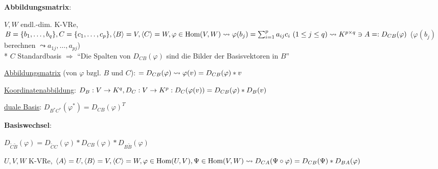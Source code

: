 \textbf{Abbildungsmatrix}:
\begin{items}
	\item $V,W$ endl.-dim. K-VRe, $B=\{ b_1, \dots, b_q \}, C=\{c_1, \dots, c_p \}, \\* \langle B \rangle = V, \langle C \rangle = W, \varphi \in \text{Hom}(V,W) \\* \leadsto \varphi(b_j)=\sum_{i=1}^p a_{ij}c_i \ (1 \leq j \leq q) \\* \leadsto K^{p \times q} \ni A =: D_{CB}(\varphi)$ ($\varphi(b_j)$ berechnen $\leadsto a_{1j},\dots,a_{pj}$) \\* $C$ Standardbasis $\Rightarrow$ ``Die Spalten von $D_{CB}(\varphi)$ sind die Bilder der Basisvektoren in $B$''
	\item \underline{Abbildungsmatrix} (von $\varphi$ bzgl. $B$ und $C$): $=D_{CB}(\varphi) \\* \leadsto \varphi(v)=D_{CB}(\varphi)*v$
	\item \underline{Koordinatenabbildung}: $D_B: V \rightarrow K^q, D_C: V \rightarrow K^p: \\* D_C(\varphi(v))=D_{CB}(\varphi)*D_B(v)$
	\item \underline{duale Basis}: $D_{B^*C^*}(\varphi^*) = D_{CB}(\varphi)^T$
\end{items}

\textbf{Basiswechsel}:
\begin{items}
	\item $D_{\tilde{C}\tilde{B}}(\varphi)=D_{\tilde{C}C}(\varphi)*D_{CB}(\varphi)*D_{B\tilde{B}}(\varphi)$
	\item $U,V,W$ K-VRe, $\langle A \rangle = U, \langle B \rangle = V, \langle C \rangle = W, \\* \varphi \in \text{Hom}(U,V), \Psi \in \text{Hom}(V,W) \\* \leadsto D_{CA}(\Psi \circ \varphi)=D_{CB}(\Psi)*D_{BA}(\varphi)$
\end{items}